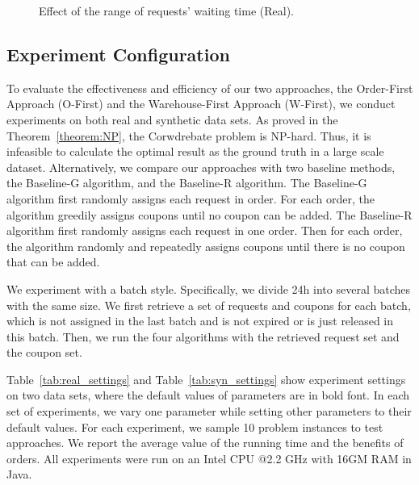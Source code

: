 \begin{figure}[t!]\centering
	\subfigcapskip=-5pt
	\vspace{-2ex}
	\addtocounter{subfigure}{-1}
	\figureCaptionMargin
	\vspace{1ex}
	\caption{\small Effect of the range of requests' waiting time (Real).}\figureBelowMargin\vspace{-1ex}
	\label{fig:real_r_wait}
\end{figure}

\vspace{-1ex}

\subsection{Experiment Configuration}\vspace{-0.5ex}
To evaluate the effectiveness and efficiency of our two approaches, the Order-First Approach (O-First) and the Warehouse-First Approach (W-First), we conduct experiments on both real and synthetic data sets. As proved in the Theorem~\ref{theorem:NP}, the Corwdrebate problem is NP-hard. Thus, it is infeasible to calculate the optimal result as the ground truth in a large scale dataset. Alternatively, we compare our approaches with two baseline methods, the Baseline-G algorithm, and the Baseline-R algorithm. The Baseline-G algorithm first randomly assigns each request in order. For each order, the algorithm greedily assigns coupons until no coupon can be added. The Baseline-R algorithm first randomly assigns each request in one order. Then for each order, the algorithm randomly and repeatedly assigns coupons until there is no coupon that can be added.

We experiment with a batch style. Specifically, we divide 24h into several batches with the same size. We first retrieve a set of requests and coupons for each batch, which is not assigned in the last batch and is not expired or is just released in this batch. Then, we run the four algorithms with the retrieved request set and the coupon set. 

Table~\ref{tab:real_settings} and Table~\ref{tab:syn_settings} show experiment settings on two data sets, where the default values of parameters are in bold font. In each set of experiments, we vary one parameter while setting other parameters to their default values. For each experiment, we sample 10 problem instances to test approaches. We report the average value of the running time and the benefits of orders. All experiments were run on an Intel CPU @2.2 GHz with 16GM RAM in Java.



